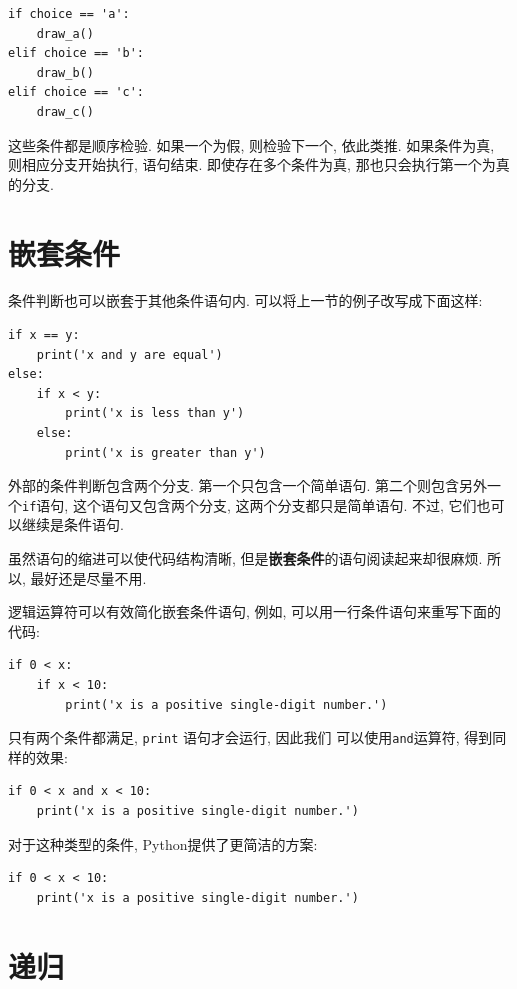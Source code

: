 \documentclass[10pt]{book}
\begin{document}
\begin{verbatim}
if choice == 'a':
    draw_a()
elif choice == 'b':
    draw_b()
elif choice == 'c':
    draw_c()
\end{verbatim}
%
这些条件都是顺序检验. 如果一个为假, 则检验下一个, 依此类推. 
如果条件为真, 则相应分支开始执行, 语句结束. 
即使存在多个条件为真, 那也只会执行第一个为真的分支.  


\section{嵌套条件}

条件判断也可以嵌套于其他条件语句内. 
可以将上一节的例子改写成下面这样:

\begin{verbatim}
if x == y:
    print('x and y are equal')
else:
    if x < y:
        print('x is less than y')
    else:
        print('x is greater than y')
\end{verbatim}
%
外部的条件判断包含两个分支. 
第一个只包含一个简单语句. 
第二个则包含另外一个{\tt if}语句, 
这个语句又包含两个分支, 这两个分支都只是简单语句. 
不过, 它们也可以继续是条件语句.

虽然语句的缩进可以使代码结构清晰, 但是{\bf 嵌套条件}的语句阅读起来却很麻烦. 
所以, 最好还是尽量不用. 

逻辑运算符可以有效简化嵌套条件语句, 例如, 可以用一行条件语句来重写下面的代码:

\begin{verbatim}
if 0 < x:
    if x < 10:
        print('x is a positive single-digit number.')
\end{verbatim}
%
只有两个条件都满足, {\tt print} 语句才会运行, 因此我们
可以使用{\tt and}运算符, 得到同样的效果:

\begin{verbatim}
if 0 < x and x < 10:
    print('x is a positive single-digit number.')
\end{verbatim}

对于这种类型的条件, Python提供了更简洁的方案:

\begin{verbatim}
if 0 < x < 10:
    print('x is a positive single-digit number.')
\end{verbatim}

\section{递归}
\label{recursion}
\end{document}
